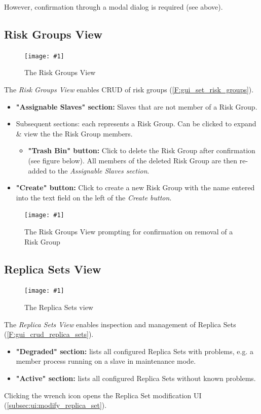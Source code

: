 \documentclass[a4paper, 11pt]{article}
\newcommand{\mamidscreenshot}[1]{\texttt{[image: \#1]}}
\newcommand{\uiel}[3]{\item \textbf{"#1" #2:} #3}
\begin{document}
However, confirmation through a modal dialog is required (see above).

\subsection{Risk Groups View}\label{subsec:ui:risk_groups_crud}
\begin{figure}[H]
	\centering
	\mamidscreenshot{screenshots/risk_groups}
	\caption{The Risk Groups View}
\end{figure}
The \textit{Risk Groups View} enables CRUD of \glspl{risk group} (\ref{F:gui_set_risk_groups}).
\begin{itemize}
	\uiel{Assignable Slaves}{section}{Slaves that are not member of a Risk Group.}
	\item Subsequent sections: each represents a Risk Group. Can be clicked to expand \& view the the Risk Group members.
	\begin{itemize}
		\uiel{Trash Bin}{button}{Click to delete the Risk Group after confirmation (see figure below). All members of the deleted Risk Group are then re-added to the \textit{Assignable Slaves section}.}
	\end{itemize}
	\uiel{Create}{button}{Click to create a new Risk Group with the name entered into the text field on the left of the \textit{Create button}.}
\end{itemize}
\begin{figure}[H]
	\centering
	\mamidscreenshot{screenshots/risk_groups_remove_confirmation}
	\caption{The Risk Groups View prompting for confirmation on removal of a Risk Group}
	\label{subsec:ui:risk_groups_removal_confirmation}
\end{figure}

\subsection{Replica Sets View}\label{subsec:ui:replica_sets_view}
\begin{figure}[H]
	\centering
	\mamidscreenshot{screenshots/replica_sets}
	\caption{The Replica Sets view}
\end{figure}
The \textit{Replica Sets View} enables inspection and management of Replica Sets (\ref{F:gui_crud_replica_sets}).
\begin{itemize}
	\uiel{Degraded}{section}{lists all configured Replica Sets with problems, e.g. a member process running on a \gls{slave} in \gls{maintenance mode}}.
	\uiel{Active}{section}{lists all configured Replica Sets without known problems}.
\end{itemize}
Clicking the wrench icon opens the Replica Set modification UI (\ref{subsec:ui:modify_replica_set}).
\end{document}
